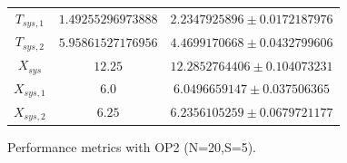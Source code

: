 \begin{figure}
\begin{center}
\begin{tabular}{|c||c|c|}
$T_{sys,1}$  & $1.49255296973888$ & $2.2347925896\pm 0.0172187976$ \\ 
$T_{sys,2}$  & $5.95861527176956$ & $4.4699170668\pm 0.0432799606$ \\ 
$X_{sys}$  & $12.25$ & $12.2852764406\pm 0.104073231$ \\ 
$X_{sys,1}$  & $6.0$ & $6.0496659147\pm 0.037506365$ \\ 
$X_{sys,2}$  & $6.25$ & $6.2356105259\pm 0.0679721177$ \\ 
\hline 
		\end{tabular}
	\end{center}
	\caption{Performance metrics with OP2 (N=20,S=5).}
	\label{tbl:evaluation-performance-metrics-2-5}
\end{figure}


%


